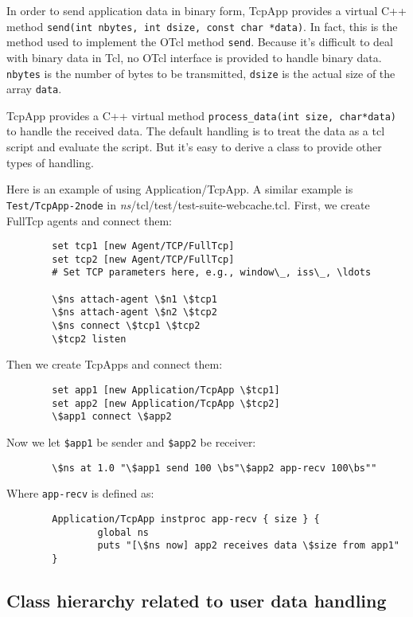In order to send application data in binary form, TcpApp provides a 
virtual C++ method {\tt send(int nbytes, int dsize, const char *data)}.
In fact, this is the method used to implement the OTcl method {\tt send}.
Because it's difficult to deal with binary data in Tcl, no OTcl interface
is provided to handle binary data. {\tt nbytes} is the number of bytes 
to be transmitted, {\tt dsize} is the actual size of the array {\tt data}.

TcpApp provides a C++ virtual method {\tt process\_data(int size, char*data)}
to handle the received data. The default handling is to treat the data 
as a tcl script and evaluate the script. But it's easy to derive a class
to provide other types of handling.

Here is an example of using Application/TcpApp. A similar example is 
{\tt Test/TcpApp-2node} in \emph{ns}/tcl/test/test-suite-webcache.tcl.
First, we create FullTcp agents and connect them:

\begin{verbatim}
        set tcp1 [new Agent/TCP/FullTcp]
        set tcp2 [new Agent/TCP/FullTcp]
        # Set TCP parameters here, e.g., window\_, iss\_, \ldots

        \$ns attach-agent \$n1 \$tcp1
        \$ns attach-agent \$n2 \$tcp2
        \$ns connect \$tcp1 \$tcp2
        \$tcp2 listen
\end{verbatim}

Then we create TcpApps and connect them:

\begin{verbatim}
        set app1 [new Application/TcpApp \$tcp1]
        set app2 [new Application/TcpApp \$tcp2]
        \$app1 connect \$app2
\end{verbatim}

Now we let {\tt \$app1} %
be sender and {\tt \$app2} %
be receiver:

\begin{verbatim}
        \$ns at 1.0 "\$app1 send 100 \bs"\$app2 app-recv 100\bs""
\end{verbatim} %

Where {\tt app-recv} is defined as:

\begin{verbatim}
        Application/TcpApp instproc app-recv { size } {
                global ns
                puts "[\$ns now] app2 receives data \$size from app1"
        }
\end{verbatim}

\subsection{Class hierarchy related to user data handling}

